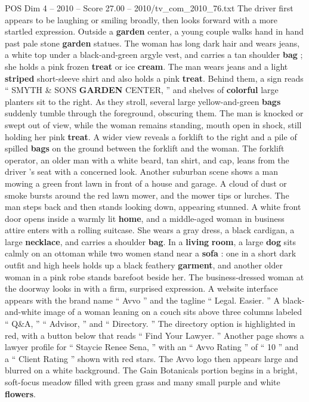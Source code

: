 \begin{textsample}{POS Dim 4 – 2010 – Score 27.00 – 2010/tv\_com\_2010\_76.txt}
The driver first appears to be laughing or smiling broadly, then looks forward with a more startled expression.
Outside a \textbf{garden} center, a young couple walks hand in hand past pale stone \textbf{garden} statues.
The woman has long dark hair and wears jeans, a white top under a black-and-green argyle vest, and carries a tan shoulder \textbf{bag} ; she holds a pink frozen \textbf{treat} or ice \textbf{cream}.
The man wears jeans and a light \textbf{striped} short-sleeve shirt and also holds a pink \textbf{treat}.
Behind them, a sign reads “ SMYTH \& SONS \textbf{GARDEN} CENTER, ” and shelves of \textbf{colorful} large planters sit to the right.
As they stroll, several large yellow-and-green \textbf{bags} suddenly tumble through the foreground, obscuring them.
The man is knocked or swept out of view, while the woman remains standing, mouth open in shock, still holding her pink \textbf{treat}.
A wider view reveals a forklift to the right and a pile of spilled \textbf{bags} on the ground between the forklift and the woman.
The forklift operator, an older man with a white beard, tan shirt, and cap, leans from the driver ’s seat with a concerned look.
Another suburban scene shows a man mowing a green front lawn in front of a house and garage.
A cloud of dust or smoke bursts around the red lawn mower, and the mower tips or lurches.
The man steps back and then stands looking down, appearing stunned.
A white front door opens inside a warmly lit \textbf{home}, and a middle-aged woman in business attire enters with a rolling suitcase.
She wears a gray dress, a black cardigan, a large \textbf{necklace}, and carries a shoulder \textbf{bag}.
In a \textbf{living} \textbf{room}, a large \textbf{dog} sits calmly on an ottoman while two women stand near a \textbf{sofa} : one in a short dark outfit and high heels holds up a black feathery \textbf{garment}, and another older woman in a pink robe stands barefoot beside her.
The business-dressed woman at the doorway looks in with a firm, surprised expression.
A website interface appears with the brand name “ Avvo ” and the tagline “ Legal.
Easier. ” A black-and-white image of a woman leaning on a couch sits above three columns labeled “ Q\&A, ” “ Advisor, ” and “ Directory. ” The directory option is highlighted in red, with a button below that reads “ Find Your Lawyer. ” Another page shows a lawyer profile for “ Staycie Renee Sena, ” with an “ Avvo Rating ” of “ 10 ” and a “ Client Rating ” shown with red stars.
The Avvo logo then appears large and blurred on a white background.
The Gain Botanicals portion begins in a bright, soft-focus meadow filled with green grass and many small purple and white \textbf{flowers}.

\end{textsample}
